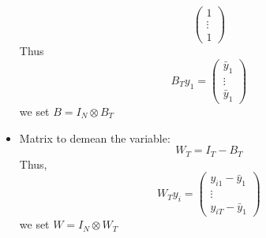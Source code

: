 \begin{itemize}
\begin{equation*}
\begin{pmatrix}
                  1 \\ \vdots \\ 1 \end{pmatrix}
          \end{equation*}
          Thus \begin{equation*}
              B_T y_1 = \begin{pmatrix}
                  \bar{y}_1 \\ \vdots \\ \bar{y}_1
              \end{pmatrix}
          \end{equation*}
          we set $B=I_N\otimes B_T$
    \item Matrix to demean the variable: \begin{equation*}
              W_T= I_T-B_T
          \end{equation*}
          Thus, \begin{equation*}
              W_T y_i = \begin{pmatrix}
                  y_{i1}-\bar{y}_1 \\ \vdots \\ y_{iT}-\bar{y}_1
              \end{pmatrix}
          \end{equation*}
          we set $W=I_N\otimes W_T$

\end{itemize}
